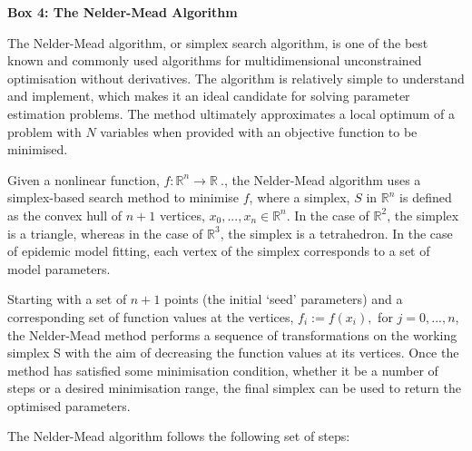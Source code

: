 \newpage
\begin{framed}
{\begin{center}{\bf Box 4: The Nelder-Mead Algorithm}\end{center}}
The Nelder-Mead algorithm, or simplex search algorithm, is one of the
best known and commonly used algorithms for multidimensional
unconstrained optimisation without derivatives. The algorithm is
relatively simple to understand and implement, which makes it an ideal
candidate for solving parameter estimation problems. The method
ultimately approximates a local optimum of a problem with $N$
variables when provided with an objective function to be minimised.

Given a nonlinear function, $f : {\mathbb
  R}^n \to {\mathbb R}\ .$, the Nelder-Mead algorithm uses a
simplex-based search method to minimise $f$, where a simplex, $S$
in ${\mathbb R}^n$ is defined as the convex hull of $n + 1$ vertices,
$x_0,...,x_n \in {\mathbb R}^n$. In the case of ${\mathbb R}^2$, the
simplex is a triangle, whereas in the case of ${\mathbb R}^3$, the
simplex is a tetrahedron. In the case of epidemic model fitting, each
vertex of the simplex corresponds to a set of model parameters.

Starting with a set of $n+1$ points (the initial `seed' parameters)
and a corresponding set of function values at the vertices, $f_i :=
f(x_i),$ for $j = 0,...,n$, the Nelder-Mead method performs a sequence
of transformations on the working simplex S with the aim of decreasing
the function values at its vertices. Once the method has satisfied
some minimisation condition, whether it be a number of steps or a
desired minimisation range, the final simplex can be used to return
the optimised parameters.

The Nelder-Mead algorithm follows the following set of
steps:


\end{framed}
